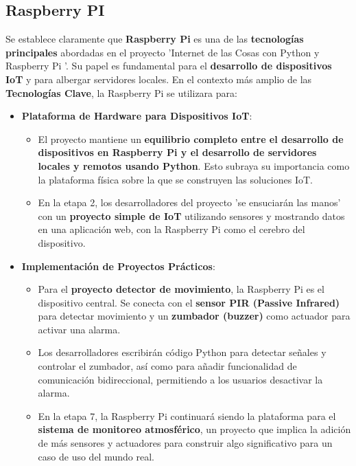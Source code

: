 \documentclass{report}
\begin{document}
\subsection{Raspberry PI}
Se establece claramente que \textbf{Raspberry Pi} \cite{raspberrypi} es una de las \textbf{tecnologías principales} 
abordadas en el proyecto  'Internet de las Cosas con Python y Raspberry Pi '. Su papel es fundamental para el \textbf{desarrollo 
de dispositivos IoT} y para albergar servidores locales. En el contexto más amplio de las \textbf{Tecnologías Clave}, la Raspberry Pi 
se utilizara para:
\begin{itemize}
    \item \textbf{Plataforma de Hardware para Dispositivos IoT}:
    \begin{itemize}
        \item El proyecto mantiene un \textbf{equilibrio completo entre el desarrollo de dispositivos en Raspberry Pi y el desarrollo 
        de servidores locales y remotos usando Python}. Esto subraya su importancia como la plataforma física sobre la que se construyen 
        las soluciones IoT.
        \item En la etapa 2, los desarrolladores del proyecto 'se ensuciarán las manos' con un \textbf{proyecto simple de IoT} utilizando 
        sensores y mostrando datos en una aplicación web, con la Raspberry Pi como el cerebro del dispositivo.
    \end{itemize}

    \item \textbf{Implementación de Proyectos Prácticos}:
    \begin{itemize}
        \item Para el \textbf{proyecto detector de movimiento}, la Raspberry Pi es el dispositivo central. Se conecta con el 
        \textbf{sensor PIR (Passive Infrared)} para detectar movimiento y un \textbf{zumbador (buzzer)} como actuador para activar una alarma.
        \item Los desarrolladores escribirán código Python para detectar señales y controlar el zumbador, así como para añadir funcionalidad 
        de comunicación bidireccional, permitiendo a los usuarios desactivar la alarma.
        \item En la etapa 7, la Raspberry Pi continuará siendo la plataforma para el \textbf{sistema de monitoreo atmosférico}, 
        un proyecto que implica la adición de más sensores y actuadores para construir algo significativo para un caso de uso del mundo real.
    \end{itemize}


\end{itemize}
\end{document}
